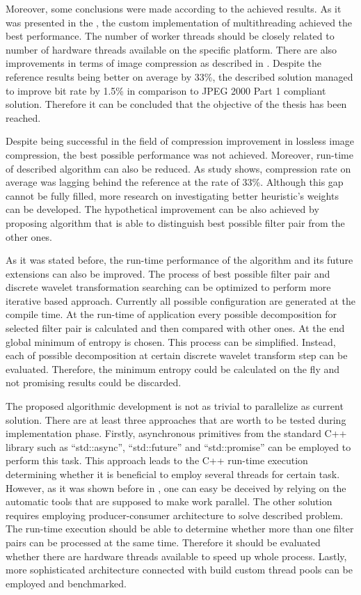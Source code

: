 Moreover, some conclusions were made according to the achieved results. As it was presented
in the , the custom implementation of multithreading achieved
the best performance. The number of worker threads should be closely related to number of
hardware threads available on the specific platform. There are also improvements in terms of
image compression as described in . Despite the reference results
being better on average by 33\%, the described solution managed to improve bit rate by 1.5\% in
comparison to JPEG 2000 Part 1 compliant solution. Therefore it can be concluded that the objective
of the thesis has been reached.

Despite being successful in the field of compression improvement in lossless image compression, the best
possible performance was not achieved. Moreover, run-time of described algorithm can also be reduced.
As study shows, compression rate on average was lagging behind the reference at the rate of 33\%. Although
this gap cannot be fully filled, more research on investigating better heuristic’s weights can be developed.
The hypothetical improvement can be also achieved by proposing algorithm that is able to distinguish best
possible filter pair from the other ones.

As it was stated before, the run-time performance of the algorithm and its future extensions can also be improved.
The process of best possible filter pair and discrete wavelet transformation searching can be optimized to perform
more iterative based approach. Currently all possible configuration are generated at the compile time. At the
run-time of application every possible decomposition for selected filter pair is calculated and then compared
with other ones. At the end global minimum of entropy is chosen. This process can be simplified. Instead, each of
possible decomposition at certain discrete wavelet transform step can be evaluated. Therefore, the minimum entropy
could be calculated on the fly and not promising results could be discarded.

The proposed algorithmic development is not as trivial to parallelize as current solution. There are at least
three approaches that are worth to be tested during implementation phase. Firstly, asynchronous primitives from
the standard C++ library such as ``std::async'', ``std::future'' and ``std::promise'' can be employed to perform
this task. This approach leads to the C++ run-time execution determining whether it is beneficial to employ several
threads for certain task. However, as it was shown before in , one can easy be deceived by relying
on the automatic tools that are supposed to make work parallel. The other solution requires employing producer-consumer
architecture to solve described problem. The run-time execution should be able to determine whether more than one
filter pairs can be processed at the same time. Therefore it should be evaluated whether there are hardware threads
available to speed up whole process. Lastly, more sophisticated architecture connected with build custom thread
pools can be employed and benchmarked.

